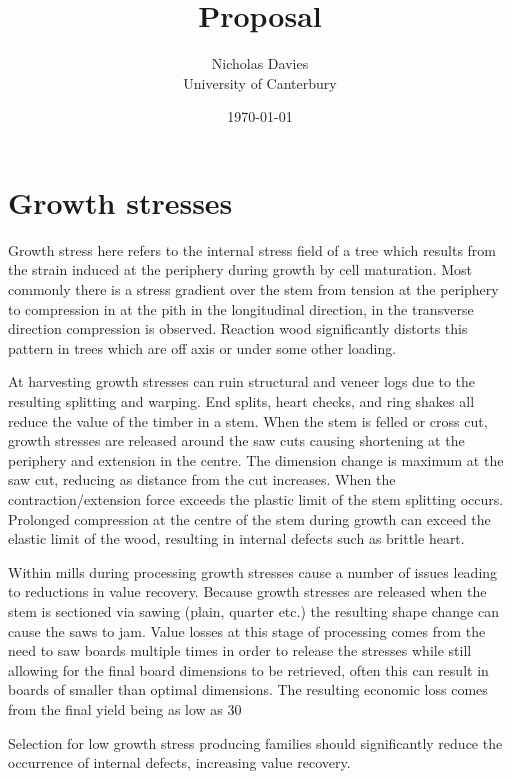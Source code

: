 \documentclass{article}
\begin{document}
\title{Proposal}

\author{Nicholas Davies\\ University of Canterbury }

\date{\today}



\maketitle


\section{Growth stresses }
Growth stress here refers to the internal stress field of a tree which
results from the strain induced at the periphery during growth by cell
maturation. Most commonly there is a stress gradient over the stem from tension
at the periphery to compression in at the pith in the longitudinal direction,
in the transverse direction compression is observed. Reaction wood significantly
distorts this pattern in trees which are off axis or under some other loading.

At harvesting growth stresses can ruin structural and veneer logs due to the
resulting splitting and warping. End splits, heart checks, and ring shakes all
reduce the value of the timber in a stem. When the stem is felled or cross cut,
growth stresses are released around the saw cuts causing shortening at the
periphery and extension in the centre. The dimension change is maximum at the
saw cut, reducing as distance from the cut increases. When the
contraction/extension force exceeds the plastic limit of the stem splitting
occurs. Prolonged compression at the centre of the stem during growth can exceed
the elastic limit of the wood, resulting in internal defects such as brittle heart.

Within mills during processing growth stresses cause a number of issues leading
to reductions in value recovery. Because growth stresses are released when the
stem is sectioned via sawing (plain, quarter etc.) the resulting shape change
can cause the saws to jam. Value losses at this stage of processing comes
from the need to saw boards multiple times in order to release the stresses
while still allowing for the final board dimensions to be retrieved, often
this can result in boards of smaller than optimal dimensions. The
resulting economic loss comes from the final yield being as low as 30%

Selection for low growth stress producing families should significantly reduce
the occurrence of internal defects, increasing value recovery.
\end{document}
